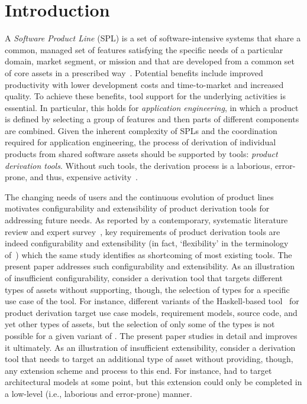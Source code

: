 
\section{Introduction}
\label{introduction}



A \emph{Software Product Line} (SPL) is a set of software-intensive systems that share a common, managed set of features satisfying the specific needs of a particular domain, market segment, or mission and that are developed from a common set of core assets in a prescribed way~\cite{spl-book}. Potential benefits include improved productivity with lower development costs and time-to-market and increased quality. To achieve these benefits, tool support for the underlying activities is essential. In particular, this holds for \emph{application engineering}, in which a product is defined by selecting a group of features and then parts of different components are combined. Given the inherent complexity of SPLs and the coordination required for application engineering, the process of derivation of individual products from shared software assets should be supported by tools: \emph{product derivation tools}. Without such tools, the derivation process is a laborious, error-prone, and thus, expensive activity~\cite{griss,deelstra:2005}.



The changing needs of users and the continuous evolution of product lines motivates configurability and extensibility of product derivation tools for addressing future needs. As reported by a contemporary, systematic literature review and expert survey~\cite{ist-2010}, key requirements of product derivation tools are indeed configurability and extensibility (in fact, `flexibility' in the terminology of~\cite{ist-2010}) which the same study identifies as shortcoming of most existing tools. The present paper addresses such configurability and extensibility. As an illustration of insufficient configurability, consider a derivation tool that targets different types of assets without supporting, though, the selection of types for a specific use case of the tool. For instance, different variants of the Haskell-based \hp{} tool~\cite{rbonifacio:sbcars2009} for product derivation target use case models, requirement models, source code, and yet other types of assets, but the selection of only some of the types is not possible for a given variant of \hp. The present paper studies \hp{} in detail and improves it ultimately. As an illustration of insufficient extensibility, consider a derivation tool that needs to target an additional type of asset without providing, though, any extension scheme and process to this end. For instance, \hp{} had to target architectural models at some point, but this extension could only be completed in a low-level (i.e., laborious and error-prone) manner.


